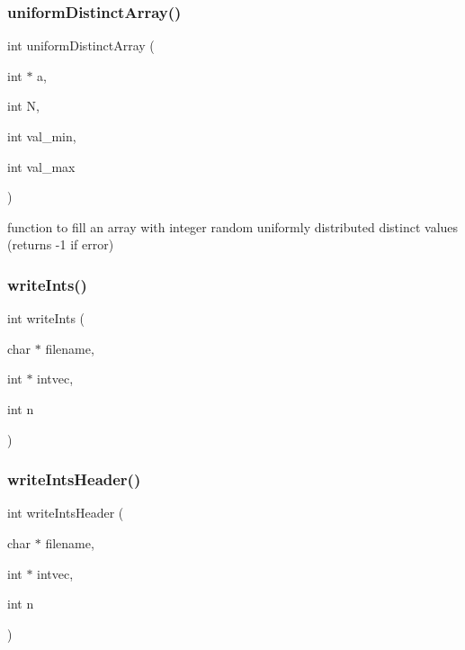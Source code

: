 \label{lib__util_8h_abe28a8d01e728c45f8f7025b78854bc1} 
\subsubsection{uniform\+Distinct\+Array()}
{\footnotesize\ttfamily int uniform\+Distinct\+Array (\begin{DoxyParamCaption}\item[{int $\ast$}]{a,  }\item[{int}]{N,  }\item[{int}]{val\+\_\+min,  }\item[{int}]{val\+\_\+max }\end{DoxyParamCaption})}



function to fill an array with integer random uniformly distributed distinct values (returns -\/1 if error) 

\label{lib__util_8h_ad9f5d69c08f2a8d2adf8531b101c6b1c} 
\subsubsection{write\+Ints()}
{\footnotesize\ttfamily int write\+Ints (\begin{DoxyParamCaption}\item[{char $\ast$}]{filename,  }\item[{int $\ast$}]{intvec,  }\item[{int}]{n }\end{DoxyParamCaption})}

\label{lib__util_8h_a90cda0201d5b07c354fbf099d5a3e2ca} 
\subsubsection{write\+Ints\+Header()}
{\footnotesize\ttfamily int write\+Ints\+Header (\begin{DoxyParamCaption}\item[{char $\ast$}]{filename,  }\item[{int $\ast$}]{intvec,  }\item[{int}]{n }\end{DoxyParamCaption})}

